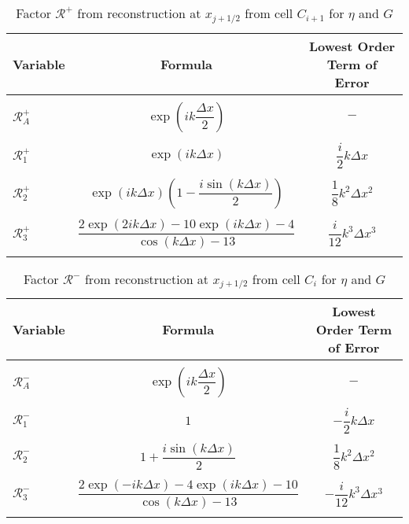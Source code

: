 \begin{table}
\centering
	\begin{tabular}{l  c  c}
		Variable& Formula& Lowest Order Term of Error\\
		\hline && \\
		$\mathcal{R}^+_A$& $\exp\left(i k \dfrac{\Delta x}{2}\right)$ & $-$ \\ & & \\
		$\mathcal{R}^+_1$& $\exp\left(i k {\Delta x}\right)$ & $\dfrac{i}{2}k \Delta x$ \\ & & \\
		$\mathcal{R}^+_2$& $\exp\left(i k {\Delta x}\right) \left(1 - \dfrac{i \sin\left(k\Delta x \right)}{2} \right)$ & $\dfrac{1}{8}k^2 \Delta x^2$ \\ & & \\
		$\mathcal{R}^+_3$& $\dfrac{2\exp\left(2ik \Delta x\right) - 10\exp\left(ik \Delta x\right) - 4}{\cos\left(k \Delta x\right) - 13}$ & $\dfrac{i}{12}k^3 \Delta x^3$ \\ & & \\
	\end{tabular}
	\caption{Factor $\mathcal{R}^+$ from reconstruction at $x_{j+1/2}$ from cell $C_{i+1}$ for $\eta$ and $G$}
	\label{tab:Rpfactor}
\end{table}

\begin{table}
	\centering
	\begin{tabular}{l  c  c}
	 	Variable& Formula& Lowest Order Term of Error\\
	 	\hline && \\
	 	$\mathcal{R}^-_A$& $\exp\left(i k \dfrac{\Delta x}{2}\right)$ & $-$ \\ & & \\
	 	$\mathcal{R}^-_1$& $1$ & $-\dfrac{i}{2}k \Delta x$ \\ & & \\
	 	$\mathcal{R}^-_2$& $1 +  \dfrac{i \sin\left(k\Delta x \right)}{2}$ & $\dfrac{1}{8}k^2 \Delta x^2$ \\ & & \\
	 	$\mathcal{R}^-_3$& $\dfrac{2 \exp\left(-i k \Delta x\right) - 4\exp\left(i k \Delta x\right) - 10}{\cos\left(k \Delta x\right) - 13}$ & $-\dfrac{i}{12}k^3 \Delta x^3$ \\ & & \\
	\end{tabular}
	\caption{Factor $\mathcal{R}^-$ from reconstruction at $x_{j+1/2}$ from cell $C_{i}$ for $\eta$ and $G$}
	\label{tab:Rmfactor}
\end{table}


